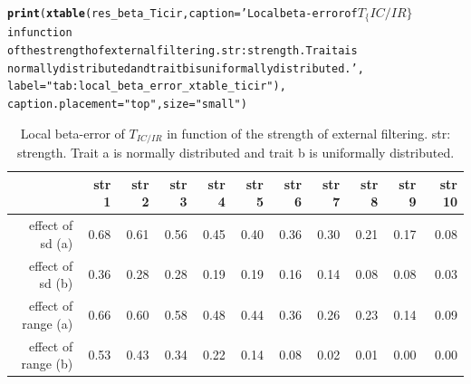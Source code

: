 \documentclass[12pt]{article}\usepackage[]{graphicx}\usepackage[]{color}
\makeatletter
\newcommand{\hlstr}[1]{\textcolor[rgb]{0.192,0.494,0.8}{#1}}%
\newcommand{\hlstd}[1]{\textcolor[rgb]{0.345,0.345,0.345}{#1}}%
\newcommand{\hlkwc}[1]{\textcolor[rgb]{0.333,0.667,0.333}{#1}}%
\newcommand{\hlkwd}[1]{\textcolor[rgb]{0.737,0.353,0.396}{\textbf{#1}}}%
\newenvironment{kframe}{%
 \def\at@end@of@kframe{}%
 \ifinner\ifhmode%
  \def\at@end@of@kframe{\end{minipage}}%
  \begin{minipage}{\columnwidth}%
 \fi\fi%
 \def\FrameCommand##1{\hskip\@totalleftmargin \hskip-\fboxsep
 \colorbox{shadecolor}{##1}\hskip-\fboxsep
     \hskip-\linewidth \hskip-\@totalleftmargin \hskip\columnwidth}%
 \MakeFramed {\advance\hsize-\width
   \@totalleftmargin\z@ \linewidth\hsize
   \@setminipage}}%
 {\par\unskip\endMakeFramed%
 \at@end@of@kframe}
\makeatother
\begin{document}
\begin{kframe}
\begin{alltt}
\hlkwd{print}\hlstd{(}\hlkwd{xtable}\hlstd{(res_beta_Ticir,} \hlkwc{caption} \hlstd{=} \hlstr{'Local beta-error of $T_\{IC/IR\}$ in function 
             of the strength of external filtering. str: strength. Trait a is 
             normally distributed and trait b is uniformally distributed.'}\hlstd{,}
             \hlkwc{label} \hlstd{=} \hlstr{"tab:local_beta_error_xtable_ticir"}\hlstd{),}
      \hlkwc{caption.placement} \hlstd{=} \hlstr{"top"}\hlstd{,} \hlkwc{size} \hlstd{=} \hlstr{"small"}\hlstd{)}
\end{alltt}
\end{kframe}%
\begin{table}[ht]
\centering
\caption{Local beta-error of $T_{IC/IR}$ in function 
             of the strength of external filtering. str: strength. Trait a is 
             normally distributed and trait b is uniformally distributed.} 
\label{tab:local_beta_error_xtable_ticir}
{\small
\begin{tabular}{rrrrrrrrrrr}
  \hline
 & str 1 & str 2 & str 3 & str 4 & str 5 & str 6 & str 7 & str 8 & str 9 & str 10 \\ 
  \hline
effect of sd (a) & 0.68 & 0.61 & 0.56 & 0.45 & 0.40 & 0.36 & 0.30 & 0.21 & 0.17 & 0.08 \\ 
  effect of sd (b) & 0.36 & 0.28 & 0.28 & 0.19 & 0.19 & 0.16 & 0.14 & 0.08 & 0.08 & 0.03 \\ 
  effect of range (a) & 0.66 & 0.60 & 0.58 & 0.48 & 0.44 & 0.36 & 0.26 & 0.23 & 0.14 & 0.09 \\ 
  effect of range (b) & 0.53 & 0.43 & 0.34 & 0.22 & 0.14 & 0.08 & 0.02 & 0.01 & 0.00 & 0.00 \\ 
   \hline
\end{tabular}
}
\end{table}
\end{document}
